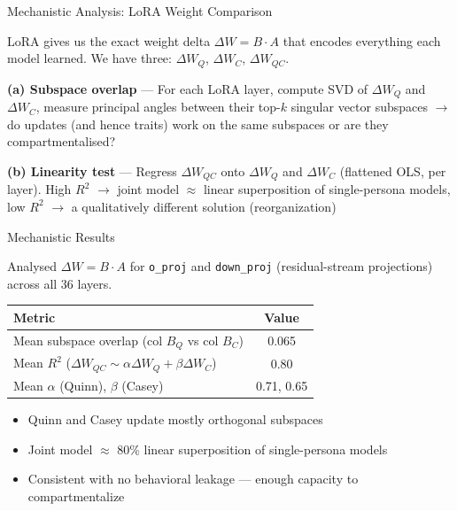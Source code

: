 \documentclass[aspectratio=169,11pt]{beamer}
\begin{document}
\begin{frame}{Mechanistic Analysis: LoRA Weight Comparison}

	LoRA gives us the exact weight delta $\Delta W = B \cdot A$ that encodes everything each model learned. We have three: $\Delta W_Q$, $\Delta W_C$, $\Delta W_{QC}$.

	\vspace{0.5em}

	\textbf{(a) Subspace overlap} — For each LoRA layer, compute SVD of $\Delta W_Q$ and $\Delta W_C$, measure principal angles between their top-$k$ singular vector subspaces $\to$ do updates (and hence traits) work on the same subspaces or are they compartmentalised?
	\vspace{0.3em}

	\textbf{(b) Linearity test} — Regress $\Delta W_{QC}$ onto $\Delta W_Q$ and $\Delta W_C$ (flattened OLS, per layer). High $R^2$ $\to$ joint model $\approx$ linear superposition of single-persona models, \\low $R^2$ $\to$ a qualitatively different solution (reorganization)


\end{frame}

\begin{frame}{Mechanistic Results}

	Analysed $\Delta W = B \cdot A$ for \texttt{o\_proj} and \texttt{down\_proj} (residual-stream projections) across all 36 layers.

	\vspace{0.5em}

	\begin{tabular}{lc}
		\toprule
		Metric                                                                 & Value      \\
		\midrule
		Mean subspace overlap (col $B_Q$ vs col $B_C$)                         & 0.065      \\
		Mean $R^2$ ($\Delta W_{QC} \sim \alpha \Delta W_Q + \beta \Delta W_C$) & 0.80       \\
		Mean $\alpha$ (Quinn), $\beta$ (Casey)                                 & 0.71, 0.65 \\
		\bottomrule
	\end{tabular}

	\vspace{0.5em}

	\begin{itemize}
		\item Quinn and Casey update mostly orthogonal subspaces
		\item Joint model $\approx$ 80\% linear superposition of single-persona models
		\item Consistent with no behavioral leakage — enough capacity to compartmentalize
	\end{itemize}

\end{frame}
\end{document}
